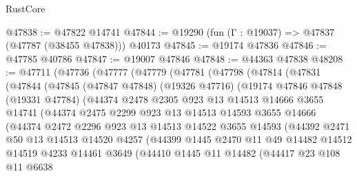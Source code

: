 \begin{lexlean}{RustCore}
\begin{coremodule}
@47838 := @47822 @14741
@47844 := @19290 (fun (Γ : @19037) => @47837 (@47787 (@38455 @47838))) @40173
@47845 := @19174 @47836
@47846 := @47785 @40786
@47847 := @19007 @47846
@47848 := @44363 @47838
@48208 := @47711
    (@47736
      (@47777
        (@47779
          (@47781
            (@47798
              (@47814
                (@47831
                  (@47844
                    (@47845
                      (@47847 @47848)
                      (@19326 @47716)
                      (@19174
                        @47846
                        @47848
                        (@19331 @47784)
                        (@44374
                          @2478
                          @2305
                          @923
                          @13
                          @14513
                          @14666
                          @3655
                          @14741
                          (@44374
                            @2475
                            @2299
                            @923
                            @13
                            @14513
                            @14593
                            @3655
                            @14666
                            (@44374
                              @2472
                              @2296
                              @923
                              @13
                              @14513
                              @14522
                              @3655
                              @14593
                              (@44392
                                @2471
                                @50
                                @13
                                @14513
                                @14520
                                @4257
                                (@44399
                                  @1445
                                  @2470
                                  @11
                                  @49
                                  @14482
                                  @14512
                                  @14519
                                  @4233
                                  @14461
                                  @3649
                                  (@44410
                                    @1445
                                    @11
                                    @14482
                                    (@44417
                                      @23
                                      @108
                                      @11
                                      @6638

\end{coremodule}
\end{lexlean}

